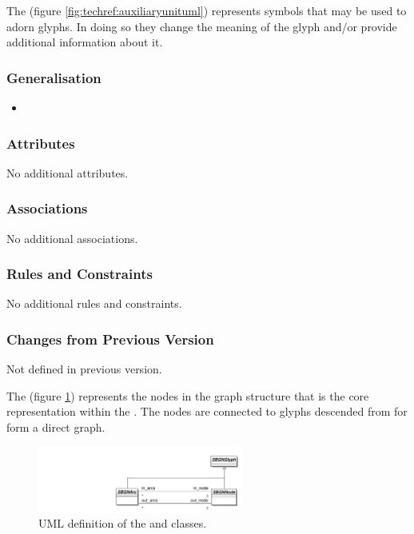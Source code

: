  The  (figure \ref{fig:techref:auxiliaryunituml}) represents symbols that may be used to
adorn glyphs. In doing so they change the meaning of the glyph and/or provide
additional information about it.

\subsubsection{Generalisation}

\begin{itemize}
\item {}
\end{itemize}

\subsubsection{Attributes}

No additional attributes.

\subsubsection{Associations}

No additional associations.

\subsubsection{Rules and Constraints}

No additional rules and constraints.

\subsubsection{Changes from Previous Version}

Not defined in previous version.


\label{defn:SBGNNode}

The  (figure \ref{fig:techref:sbgnnodearcuml}) represents
the nodes in the graph structure that is the core representation
within the \PDl. The nodes are connected to glyphs descended from
 for form a direct graph.

\begin{figure}[htb]
  \centering
  \includegraphics[width=0.6\textwidth]{images/sbgnnodearcuml}
\caption{UML definition of the  and
   classes.}
  \label{fig:techref:sbgnnodearcuml}
\end{figure}

